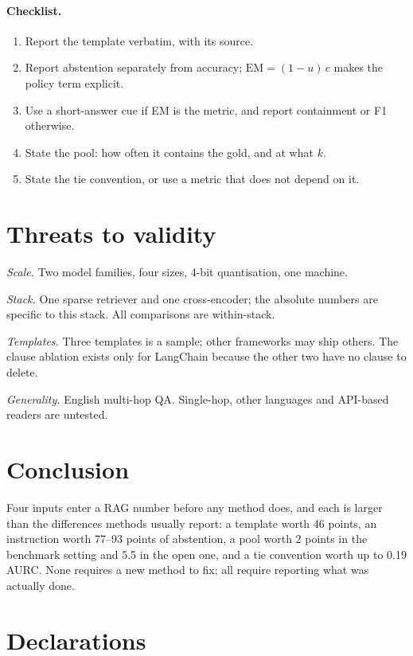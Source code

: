 ﻿\documentclass[11pt]{article}
\begin{document}
\paragraph{Checklist.}
\begin{enumerate}
\item Report the template verbatim, with its source.
\item Report abstention separately from accuracy; $\mathrm{EM}=(1-u)\,c$ makes the policy term
explicit.
\item Use a short-answer cue if EM is the metric, and report containment or F1 otherwise.
\item State the pool: how often it contains the gold, and at what $k$.
\item State the tie convention, or use a metric that does not depend on it.
\end{enumerate}

\section{Threats to validity}

\emph{Scale.} Two model families, four sizes, 4-bit quantisation, one machine.

\emph{Stack.} One sparse retriever and one cross-encoder; the absolute numbers are specific to
this stack. All comparisons are within-stack.

\emph{Templates.} Three templates is a sample; other frameworks may ship others. The clause
ablation exists only for LangChain because the other two have no clause to delete.

\emph{Generality.} English multi-hop QA. Single-hop, other languages and API-based readers are
untested.

\section{Conclusion}

Four inputs enter a RAG number before any method does, and each is larger than the differences
methods usually report: a template worth 46 points, an instruction worth 77--93 points of
abstention, a pool worth 2 points in the benchmark setting and 5.5 in the open one, and a tie
convention worth up to 0.19 AURC. None requires a new method to fix; all require reporting what
was actually done.

\section*{Declarations}
\end{document}
